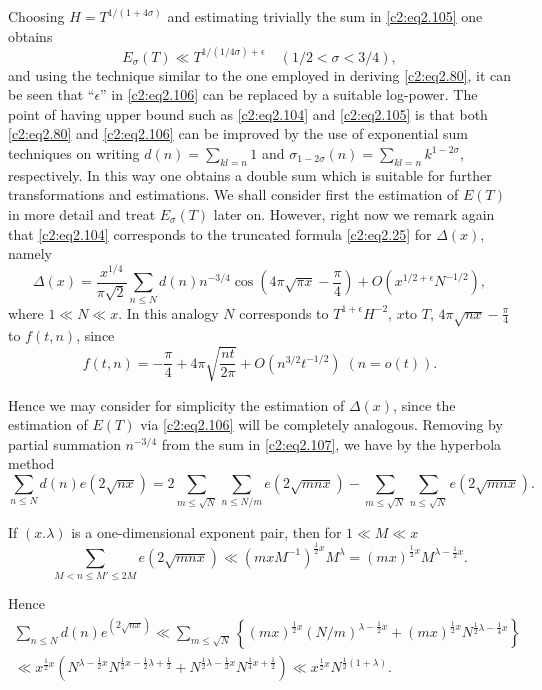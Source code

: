 Choosing $H= T^{1/(1+ 4\sigma)}$ and estimating trivially the sum in
\eqref{c2:eq2.105} one obtains  
\begin{equation}
  E_\sigma (T) \ll T^{1/(1/4\sigma)+\epsilon} \quad (1/2 < \sigma <
  3/4),\label{c2:eq2.106} 
\end{equation}
and using the technique similar to the one employed in deriving
\eqref{c2:eq2.80}, it can be seen that ``$\epsilon$'' in
\eqref{c2:eq2.106} can be replaced by a suitable log-power. The point of
having upper bound such as \eqref{c2:eq2.104} and \eqref{c2:eq2.105}
is that both \eqref{c2:eq2.80} and \eqref{c2:eq2.106} can be improved
by the use of exponential sum techniques on writing $d(n) =
\sum\limits_{kl=n} 1$ and $\sigma_{1- 2 \sigma} (n)=
\displaystyle{\sum_{kl=n} k^{1-2 \sigma}}$, respectively. In this way
one obtains a double sum which is suitable for further transformations
and estimations. We shall consider first the estimation of $E(T)$ in
more detail and treat $E_\sigma(T)$ later on. However, right now we
remark again that \eqref{c2:eq2.104} corresponds to the truncated
formula \eqref{c2:eq2.25} for $\Delta  (x)$, namely 
\begin{equation}
  \Delta (x) = \frac{x^{1/4}}{\pi \sqrt{2}} \sum_{n \leq N}d(n)
  n^{-3/4} \cos \left( 4 \pi \sqrt{\pi x} - \frac{\pi}{4}\right) +
  O\left(x^{1/2 + \epsilon}N^{-1/2} \right),\label{c2:eq2.107}
\end{equation}
where $1 \ll N \ll x$. In this analogy $N$ corresponds to $T^{1 +
  \epsilon} H^{-2}$, $x$\pageoriginale to $T$, $4 \pi \sqrt{nx}-
\frac{\pi}{4}$ to $f(t, n)$, since
$$ 
f(t, n) =- \frac{\pi}{4} + 4 \pi \sqrt{\frac{n t}{2 \pi}} +
O(n^{3/2}t^{-1/2}) \;  (n=o(t)).
$$

Hence we may consider for simplicity the estimation of $\Delta 
(x)$, since the estimation of $E(T)$ via \eqref{c2:eq2.106} will be
completely analogous. Removing by partial summation $n^{-3/4}$ from
the sum in \eqref{c2:eq2.107}, we have by the hyperbola method
$$
\sum_{n \leq N} d(n) e(2 \sqrt{nx})=2 \sum_{m \leq \sqrt{N}} \sum_{n
  \leq N/m} e (2 \sqrt{mnx})- \sum_{m \leq \sqrt{N}} \sum_{n \leq
  \sqrt{N}} e(2 \sqrt{mnx}).
$$

If $(x. \lambda)$ is a one-dimensional exponent pair, then for $1 \ll
M \ll x$
$$ 
\sum_{M < n\leq M' \leq 2M} e(2 \sqrt{mnx}) \ll (mx M^{-1})^{\frac{1}{2} x} M^\lambda = (mx)^{\frac{1}{2}x}M^{\lambda - \frac{1}{2} x}. 
$$

Hence 
\begin{multline*}
  \sum_{n \leq N} d(n) e^{(2 \sqrt{nx})} \ll \sum_{m \leq \sqrt{N}}
  \left\{(mx)^{\frac{1}{2}x} (N/m)^{\lambda - \frac{1}{2} x} + (mx)^{\frac{1}{2} x}N^{\frac{1}{2}
    \lambda - \frac{1}{4} x}  \right\}\\
  \ll x^{\frac{1}{2} x} (N^{\lambda - \frac{1}{2} x} N^{\frac{1}{2} x- \frac{1}{2} \lambda + \frac{1}{2}} +
  N^{\frac{1}{2} \lambda - \frac{1}{2} x} N^{\frac{1}{4} x + \frac{1}{2}})\ll x^{\frac{1}{2} x}N^{\frac{1}{2}(1+ \lambda)}.
\end{multline*}

